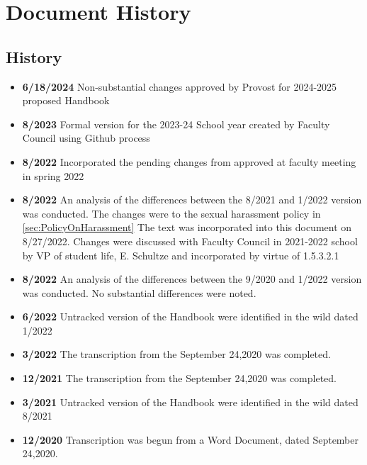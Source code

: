 \section{Document History}
	\subsection{History}
		\begin{itemize}
			\item{{\bfseries 6/18/2024} Non-substantial changes approved by Provost for 2024-2025 proposed Handbook }
			\item{{\bfseries 8/2023} Formal version for the 2023-24 School year created by Faculty Council using Github process }
			\item{{\bfseries 8/2022} Incorporated the pending changes from approved at faculty meeting in spring 2022}
			\item{{\bfseries 8/2022} An analysis of the differences between the 8/2021 and 1/2022 version was conducted.
				The changes were to the sexual harassment policy in
				\ref{sec:PolicyOnHarassment}
				The text was incorporated into this document on 8/27/2022.
				Changes were discussed with Faculty Council in 2021-2022 school
				by VP of student life, E. Schultze and incorporated by virtue of 1.5.3.2.1
			}
			\item{{\bfseries 8/2022} An analysis of the differences between the 9/2020 and 1/2022 version was conducted. No substantial differences were noted.}
			\item{{\bfseries 6/2022} Untracked version of the Handbook were identified in the wild dated 1/2022}
			\item{{\bfseries 3/2022} The transcription from the September 24,2020 was completed.}
			\item{{\bfseries 12/2021} The transcription from the September 24,2020 was completed.}
			\item{{\bfseries 3/2021} Untracked version of the Handbook were identified in the wild dated 8/2021}
			\item{{\bfseries 12/2020} Transcription was begun from a Word Document, dated September 24,2020.}
		\end{itemize}